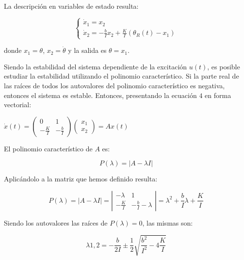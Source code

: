 \documentclass{sig-alternate}
\begin{document}
La descripci\'on en variables de estado resulta:

\begin{equation}
\label{var_estados_model1}
\begin{cases} 
    \dot x_1 = x_2 \\
    \dot x_2 = -\frac{b}{I} x_2 + \frac{K}{I} (\theta_R(t) - x_1)
\end{cases}
\end{equation}

donde $x_1 = \theta$, $x_2 = \dot \theta$ y la salida es $\theta=x_1$.

Siendo la estabilidad del sistema dependiente de la excitaci\'{o}n $u(t)$,
es posible estudiar la estabilidad utilizando el polinomio caracter\'istico. 
Si la parte real de las ra\'{i}ces de
todos los autovalores del polinomio caracter\'istico es negativa, entonces 
el sistema es estable. Entonces, presentando la ecuaci\'{o}n $4$ en forma vectorial:
\begin{center}
$
\dot x(t) = 
\left( \begin{array}{cc}
0 & 1 \\
-\frac{K}{I} & -\frac{b}{I}
\end{array} \right)
\left( \begin{array}{c}
x_1 \\
x_2
\end{array} \right)
= Ax(t)
$
\end{center}
El polinomio caracter\'istico de $A$ es:

\begin{equation}
 P( \lambda ) = |A - \lambda I|
\end{equation}

Aplic\'{a}ndolo a la matriz que hemos definido resulta:

\begin{equation}
 P( \lambda ) = |A - \lambda I| = 
\left| \begin{array}{cc}
-\lambda & 1 \\
-\frac{K}{I} & -\frac{b}{I}-\lambda
\end{array} \right| 
=
\lambda^2 + \frac{b}{I} \lambda + \frac{K}{I}
\end{equation}

Siendo los autovalores las ra\'ices de $P(\lambda) = 0$, las mismas son:

\begin{equation}
 \lambda{1,2} = - \frac{b}{2I} \pm \frac{1}{2} \sqrt{\frac{b^2}{I^2}-4\frac{K}{I}}
\end{equation}
\end{document}
